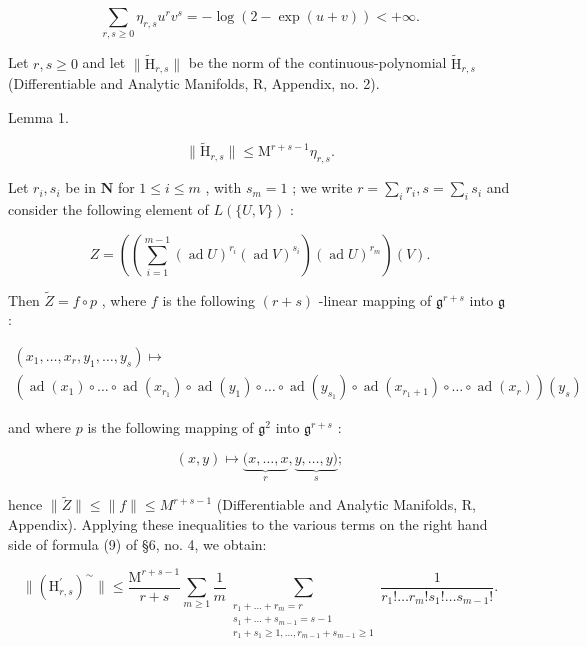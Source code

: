 \[
\sum_ {r, s \geqslant 0} \eta_ {r, s} u ^ {r} v ^ {s} = - \log (2 - \exp (u + v)) <   + \infty .\tag{9}
\]

Let \(r, s \geqslant 0\) and let \(\| \tilde{\mathrm{H}}_{r,s} \|\) be the norm of the continuous-polynomial \(\tilde{\mathrm{H}}_{r,s}\) (Differentiable and Analytic Manifolds, R, Appendix, no. 2).

Lemma 1.

\[
\| \widetilde {\mathrm{H}} _ {r, s} \| \leqslant \mathrm{M} ^ {r + s - 1} \eta_ {r, s}.
\]

Let \(r_i, s_i\) be in \(\mathbf{N}\) for \(1 \leqslant i \leqslant m\) , with \(s_m = 1\) ; we write \(r = \sum_{i} r_i, s = \sum_{i} s_i\) and consider the following element of \(L(\{U, V\})\) :

\[
Z = \left(\left(\sum_ {i = 1} ^ {m - 1} (\operatorname{ad} U) ^ {r _ {i}} (\operatorname{ad} V) ^ {s _ {i}}\right) (\operatorname{ad} U) ^ {r _ {m}}\right) (V).
\]

Then \(\tilde{Z} = f \circ p\) , where \(f\) is the following \((r + s)\) -linear mapping of \(\mathfrak{g}^{r + s}\) into \(\mathfrak{g}\) :

\[
\begin{array}{l} \left(x _ {1}, \dots , x _ {r}, y _ {1}, \dots , y _ {s}\right) \mapsto \\ \left(\operatorname{ad} \left(x _ {1}\right) \circ \dots \circ \operatorname{ad} \left(x _ {r _ {1}}\right) \circ \operatorname{ad} \left(y _ {1}\right) \circ \dots \circ \operatorname{ad} \left(y _ {s _ {1}}\right) \circ \operatorname{ad} \left(x _ {r _ {1} + 1}\right) \circ \dots \circ \operatorname{ad} \left(x _ {r}\right)\right) \left(y _ {s}\right) \end{array}
\]

and where \(p\) is the following mapping of \(\mathfrak{g}^2\) into \(\mathfrak{g}^{r+s}\) :

\[
(x, y) \mapsto \underbrace {(x , \dots , x} _ {r}, \underbrace {y , \dots , y)} _ {s};
\]

hence \(\| \tilde{Z}\| \leqslant \| f\| \leqslant M^{r + s - 1}\) (Differentiable and Analytic Manifolds, R, Appendix). Applying these inequalities to the various terms on the right hand side of formula (9) of §6, no. 4, we obtain:

\[
\| (\mathrm{H} _ {r, s} ^ {\prime}) ^ {\sim} \| \leqslant \frac {\mathrm{M} ^ {r + s - 1}}{r + s} \sum_ {m \geqslant 1} \frac {1}{m} \sum_ {\substack {r _ {1} + \dots + r _ {m} = r \\ s _ {1} + \dots + s _ {m - 1} = s - 1 \\ r _ {1} + s _ {1} \geqslant 1, \dots , r _ {m - 1} + s _ {m - 1} \geqslant 1}} \frac {1}{r _ {1} ! \dots r _ {m} ! s _ {1} ! \dots s _ {m - 1} !}.\tag{10}
\]

